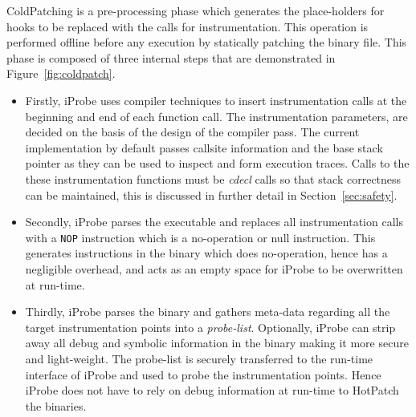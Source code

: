 ColdPatching is a pre-processing phase which generates the place-holders for hooks to be replaced with the calls for instrumentation. 
This operation is performed offline before any execution by statically patching the binary file. 
This phase is composed of three internal steps that are demonstrated in Figure~\ref{fig:coldpatch}. 

\begin{itemize}

\item Firstly, iProbe uses compiler techniques to insert instrumentation calls at the beginning and end of each function call. 
The instrumentation parameters, are decided on the basis of the design of the compiler pass. 
The current implementation by default passes callsite information and the base stack pointer as they can be used to inspect and form execution traces. 
Calls to the these instrumentation functions must be \emph{cdecl} calls so that stack correctness can be maintained, this is discussed in further detail in Section~\ref{sec:safety}.

\item Secondly, iProbe parses the executable and replaces all instrumentation calls with a \texttt{NOP} instruction which is a no-operation or null instruction. 
This generates instructions in the binary which does no-operation, hence has a negligible overhead, and acts as an empty space for iProbe to be overwritten at run-time.

\item Thirdly, iProbe parses the binary and gathers meta-data regarding all the target instrumentation points into a \emph{probe-list}.
Optionally, iProbe can strip away all debug and symbolic information in the binary making it more secure and light-weight. 
The probe-list is securely transferred to the run-time interface of iProbe and used to probe the instrumentation points. 
Hence iProbe does not have to rely on debug information at run-time to HotPatch the binaries.

\end{itemize}


